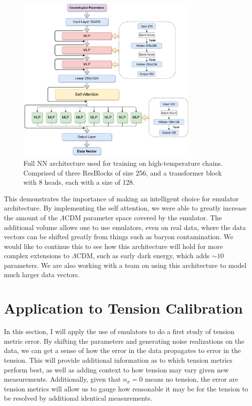 \begin{figure}[!tb]
	\centering
	\includegraphics[width=0.8\textwidth]{plots/Untitled Diagram.drawio-5.pdf}
	\caption{Full NN architecture used for training on high-temperature chains. Comprised of three ResBlocks of size 256, and a transformer block with 8 heads, each with a size of 128.}
	\label{fig:full_arch}
\end{figure}

This demonstrates the importance of making an intelligent choice for emulator architecture. By implementing the self attention, we were able to greatly increase the amount of the $\Lambda$CDM parameter space covered by the emulator. The additional volume allows one to use emulators, even on real data, where the data vectors can be shifted greatly from things such as baryon contamination. We would like to continue this to see how this architecture will hold for more complex extensions to $\Lambda$CDM, such as early dark energy, which adds $\sim10$ parameters. We are also working with a team on using this architecture to model much larger data vectors.

\section{Application to Tension Calibration}
In this section, I will apply the use of emulators to do a first study of tension metric error. By shifting the parameters and generating noise realizations on the data, we can get a sense of how the error in the data propagates to error in the tension. This will provide additional information as to which tension metrics perform best, as well as adding context to how tension may vary given new measurements. Additionally, given that $n_\sigma=0$ means no tension, the error are tension metrics will allow us to gauge how reasonable it may be for the tension to be resolved by additional identical measurements.

